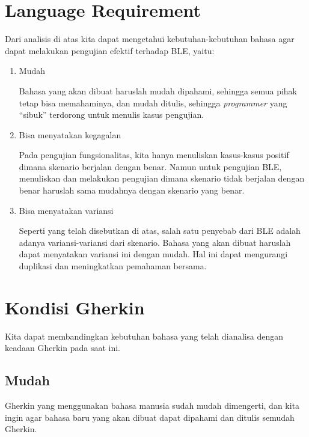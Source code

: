 \section{Language Requirement}

Dari analisis di atas kita dapat mengetahui kebutuhan-kebutuhan bahasa
agar dapat melakukan pengujian efektif terhadap BLE, yaitu:

\begin{enumerate}
  \item Mudah

        Bahasa yang akan dibuat haruslah mudah dipahami, sehingga semua pihak tetap
        bisa memahaminya, dan mudah ditulis, sehingga \emph{programmer} yang ``sibuk''
        terdorong untuk menulis kasus pengujian.

  \item Bisa menyatakan kegagalan

        Pada pengujian fungsionalitas, kita hanya menuliskan kasus-kasus positif
        dimana skenario berjalan dengan benar. Namun untuk pengujian BLE,
        menuliskan dan melakukan pengujian dimana skenario tidak berjalan dengan benar
        haruslah sama mudahnya dengan skenario yang benar.

  \item Bisa menyatakan variansi

        Seperti yang telah disebutkan di atas, salah satu penyebab dari BLE adalah
        adanya variansi-variansi dari skenario.
        Bahasa yang akan dibuat haruslah dapat menyatakan variansi ini dengan mudah.
        Hal ini dapat mengurangi duplikasi dan meningkatkan pemahaman bersama.
\end{enumerate}



\section{Kondisi Gherkin}

Kita dapat membandingkan kebutuhan bahasa yang telah dianalisa dengan keadaan Gherkin pada saat ini.

\subsection*{Mudah}

Gherkin yang menggunakan bahasa manusia sudah mudah dimengerti, dan kita ingin agar bahasa
baru yang akan dibuat dapat dipahami dan ditulis semudah Gherkin.

